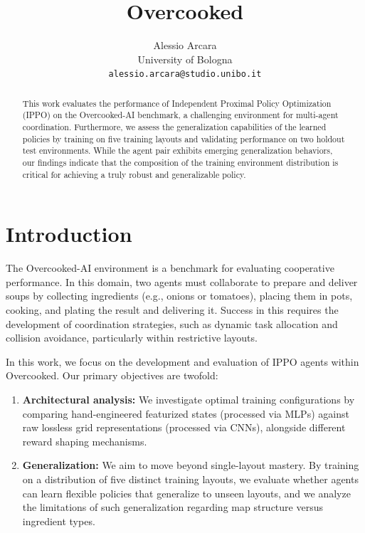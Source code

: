 \documentclass{article}
\title{Overcooked}
\author{%
    Alessio Arcara\\
    University of Bologna\\
    \texttt{alessio.arcara@studio.unibo.it}
}
\begin{document}
\maketitle


\begin{abstract}
    This work evaluates the performance of Independent Proximal Policy
    Optimization (IPPO) on the Overcooked-AI benchmark, a challenging
    environment for multi-agent coordination. Furthermore, we assess the
    generalization capabilities of the learned policies by training on five
    training layouts and validating performance on two holdout test
    environments. While the agent pair exhibits emerging generalization
    behaviors, our findings indicate that the composition of the training
    environment distribution is critical for achieving a truly robust and
    generalizable policy.
\end{abstract}

\section{Introduction}


The Overcooked-AI environment \cite{carroll2020utilitylearninghumanshumanai}
is a benchmark for evaluating cooperative performance. In this domain, two
agents must collaborate to prepare and deliver soups by collecting ingredients
(e.g., onions or tomatoes), placing them in pots, cooking, and plating the
result and delivering it. Success in this requires the development of
coordination strategies, such as dynamic task allocation and collision
avoidance, particularly within restrictive layouts.

In this work, we focus on the development and evaluation of IPPO agents within
Overcooked. Our primary objectives are twofold:
\begin{enumerate}
    \item \textbf{Architectural analysis:} We investigate optimal training
        configurations by comparing hand-engineered featurized states
        (processed via MLPs) against raw lossless grid representations
        (processed via CNNs), alongside different reward shaping mechanisms.
    \item \textbf{Generalization:} We aim to move beyond single-layout
        mastery. By training on a distribution of five distinct training
        layouts, we evaluate whether agents can learn flexible policies that
        generalize to unseen layouts, and we analyze the limitations of such
        generalization regarding map structure versus ingredient types.
\end{enumerate}
\end{document}
